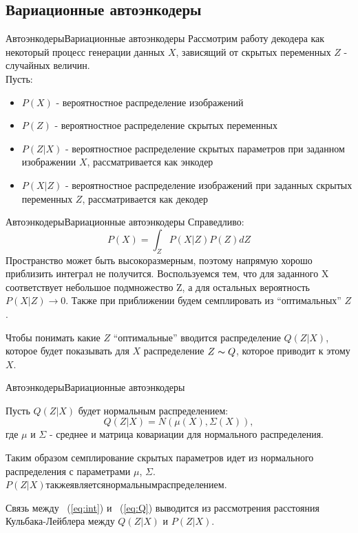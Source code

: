 \documentclass{beamer}
\begin{document}
\subsection{Вариационные автоэнкодеры}

\begin{frame}{Автоэнкодеры}{Вариационные автоэнкодеры}
Рассмотрим работу декодера как некоторый процесс генерации данных $X$, зависящий от скрытых переменных $Z$ - случайных величин.\\
Пусть:
\begin{itemize}
	\item $P(X)$ - вероятностное распределение изображений
	\item $P(Z)$ - вероятностное распределение скрытых переменных
	\item $P(Z|X)$ - вероятностное распределение скрытых параметров при заданном изображении $X$, рассматривается как энкодер
	\item $P(X|Z)$ - вероятностное распределение изображений при заданных скрытых переменных $Z$, рассматривается как декодер
\end{itemize}
\end{frame}

\begin{frame}{Автоэнкодеры}{Вариационные автоэнкодеры}
Справедливо:
\begin{equation}\label{eq:int}
P(X) = \int_{Z} P(X|Z)P(Z) dZ
\end{equation}
Пространство может быть высокоразмерным, поэтому напрямую хорошо приблизить интеграл не получится. Воспользуемся тем, что для заданного X соответствует небольшое подмножество Z, а для остальных вероятность $P(X|Z) \to 0$. Также при приближении будем семплировать из ``оптимальных'' $Z$. \par\medskip
Чтобы понимать какие $Z$ ``оптимальные'' вводится распределение $Q(Z|X)$, которое будет показывать для $X$ распределение $Z \thicksim Q$, которое приводит к этому $X$.
\end{frame}

\begin{frame}{Автоэнкодеры}{Вариационные автоэнкодеры}

Пусть $Q(Z|X)$ будет нормальным распределением:
\begin{equation}\label{eq:Q}
Q(Z|X) = N(\mu(X), \Sigma(X)),
\end{equation}
где $\mu$ и $\Sigma$ - среднее и матрица ковариации для нормального распределения. \par\medskip
Таким образом семплирование скрытых параметров идет из нормального распределения с параметрами $\mu$, $\Sigma$. $P(Z|X) также является нормальным распределением$. \par\medskip
Связь между ~(\ref{eq:int}) и ~(\ref{eq:Q}) выводится из рассмотрения расстояния Кульбака-Лейблера между $Q(Z|X)$ и $P(Z|X)$.

\end{frame}
\end{document}
